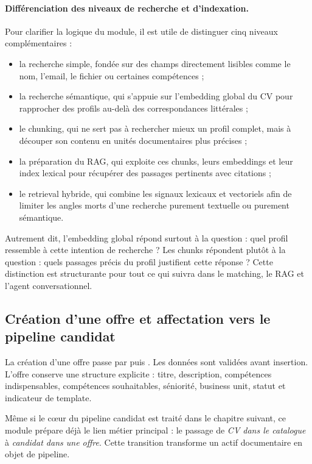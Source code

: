 \paragraph{Différenciation des niveaux de recherche et d'indexation.}
Pour clarifier la logique du module, il est utile de distinguer cinq niveaux complémentaires :
\begin{itemize}
  \item la recherche simple, fondée sur des champs directement lisibles comme le nom, l'email, le fichier ou certaines compétences ;
  \item la recherche sémantique, qui s'appuie sur l'embedding global du CV pour rapprocher des profils au-delà des correspondances littérales ;
  \item le chunking, qui ne sert pas à rechercher mieux un profil complet, mais à découper son contenu en unités documentaires plus précises ;
  \item la préparation du RAG, qui exploite ces chunks, leurs embeddings et leur index lexical pour récupérer des passages pertinents avec citations ;
  \item le retrieval hybride, qui combine les signaux lexicaux et vectoriels afin de limiter les angles morts d'une recherche purement textuelle ou purement sémantique.
\end{itemize}

Autrement dit, l'embedding global répond surtout à la question : quel profil ressemble à cette intention de recherche ? Les chunks répondent plutôt à la question : quels passages précis du profil justifient cette réponse ? Cette distinction est structurante pour tout ce qui suivra dans le matching, le RAG et l'agent conversationnel.

\subsection{Création d'une offre et affectation vers le pipeline candidat}
La création d'une offre passe par  puis . Les données sont validées avant insertion. L'offre conserve une structure explicite : titre, description, compétences indispensables, compétences souhaitables, séniorité, business unit, statut et indicateur de template.

Même si le c\oe{}ur du pipeline candidat est traité dans le chapitre suivant, ce module prépare déjà le lien métier principal : le passage de \textit{CV dans le catalogue} à \textit{candidat dans une offre}. Cette transition transforme un actif documentaire en objet de pipeline.

